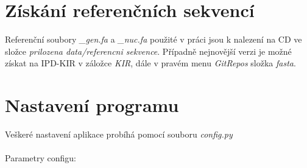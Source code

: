 \documentclass[czech,DP]{thesiskiv}
\numberwithin{equation}{section}
\begin{document}
\section{Získání referenčních sekvencí}
\label{sec:ref_sek}
Referenční soubory \textit{\_gen.fa} a \textit{\_nuc.fa} použité v práci jsou k nalezení na CD ve složce \textit{prilozena data/referencni sekvence}. Případně nejnovější verzi je možné získat na IPD-KIR \cite{imgt_hla_database} v záložce \textit{KIR}, dále v pravém menu \textit{GitRepos} složka \textit{fasta}.

\section{Nastavení programu}
Veškeré nastavení aplikace probíhá pomocí souboru \textit{config.py}
\\
\\
\noindent
Parametry configu:
\end{document}
